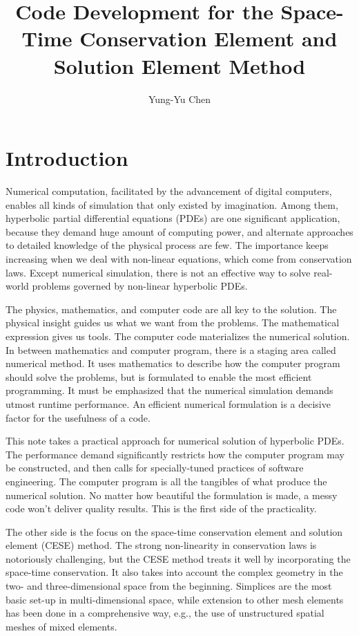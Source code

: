 \documentclass{turgon}
\title{
%
Code Development for the Space-Time Conservation Element and Solution Element
Method
%
}
\author{
%
Yung-Yu Chen
%
}
\begin{document}
\maketitle

\tableofcontents

\chapter*{Introduction}

Numerical computation, facilitated by the advancement of digital computers,
enables all kinds of simulation that only existed by imagination.  Among them,
hyperbolic partial differential equations (PDEs) are one significant
application, because they demand huge amount of computing power, and alternate
approaches to detailed knowledge of the physical process are few.  The
importance keeps increasing when we deal with non-linear equations, which come
from conservation laws.  Except numerical simulation, there is not an effective
way to solve real-world problems governed by non-linear hyperbolic PDEs.

The physics, mathematics, and computer code are all key to the solution.  The
physical insight guides us what we want from the problems.  The mathematical
expression gives us tools.  The computer code materializes the numerical
solution.  In between mathematics and computer program, there is a staging area
called numerical method.  It uses mathematics to describe how the computer
program should solve the problems, but is formulated to enable the most
efficient programming.  It must be emphasized that the numerical simulation
demands utmost runtime performance.  An efficient numerical formulation is a
decisive factor for the usefulness of a code.

This note takes a practical approach for numerical solution of hyperbolic PDEs.
The performance demand significantly restricts how the computer program may be
constructed, and then calls for specially-tuned practices of software
engineering.  The computer program is all the tangibles of what produce the
numerical solution.  No matter how beautiful the formulation is made, a messy
code won't deliver quality results.  This is the first side of the
practicality.

The other side is the focus on the space-time conservation element and solution
element (CESE) method.  The strong non-linearity in conservation laws is
notoriously challenging, but the CESE method treats it well by incorporating
the space-time conservation.  It also takes into account the complex geometry
in the two- and three-dimensional space from the beginning.  Simplices are the
most basic set-up in multi-dimensional space, while extension to other mesh
elements has been done in a comprehensive way, e.g., the use of unstructured
spatial meshes of mixed elements.
\end{document}
